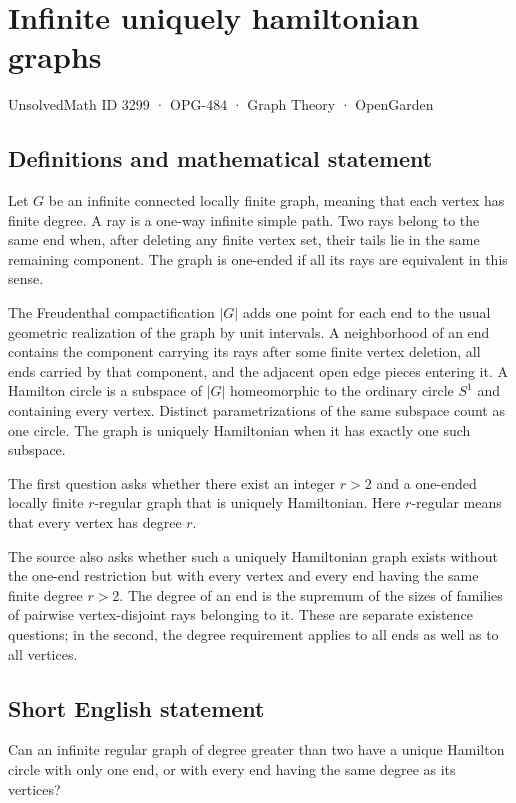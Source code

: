 \documentclass[11pt,a4paper]{article}
\begin{document}
\section*{Infinite uniquely hamiltonian graphs}\label{3299}
{\small UnsolvedMath ID 3299 · OPG-484 · Graph Theory · OpenGarden}
\subsection{Definitions and mathematical statement}
Let $G$ be an infinite connected locally finite graph, meaning that each vertex has finite degree. A ray is a one-way infinite simple path. Two rays belong to the same end when, after deleting any finite vertex set, their tails lie in the same remaining component. The graph is one-ended if all its rays are equivalent in this sense.

The Freudenthal compactification $|G|$ adds one point for each end to the usual geometric realization of the graph by unit intervals. A neighborhood of an end contains the component carrying its rays after some finite vertex deletion, all ends carried by that component, and the adjacent open edge pieces entering it. A Hamilton circle is a subspace of $|G|$ homeomorphic to the ordinary circle $S^1$ and containing every vertex. Distinct parametrizations of the same subspace count as one circle. The graph is uniquely Hamiltonian when it has exactly one such subspace.

The first question asks whether there exist an integer $r>2$ and a one-ended locally finite $r$-regular graph that is uniquely Hamiltonian. Here $r$-regular means that every vertex has degree $r$.

The source also asks whether such a uniquely Hamiltonian graph exists without the one-end restriction but with every vertex and every end having the same finite degree $r>2$. The degree of an end is the supremum of the sizes of families of pairwise vertex-disjoint rays belonging to it. These are separate existence questions; in the second, the degree requirement applies to all ends as well as to all vertices.
\subsection{Short English statement}
Can an infinite regular graph of degree greater than two have a unique Hamilton circle with only one end, or with every end having the same degree as its vertices?
\end{document}
